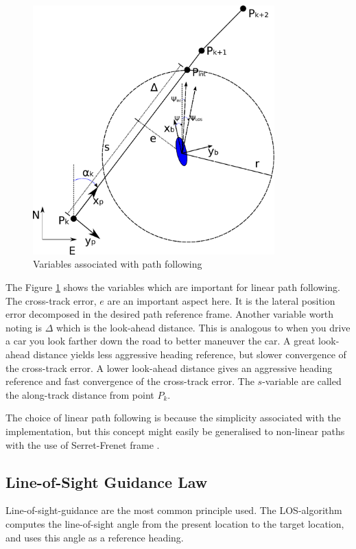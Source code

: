 	\begin{figure}[hbtp]
		\centering
		\includegraphics[width=0.83\textwidth]{pics/waypoint}
		\caption{Variables associated with path following}
		\label{fig:ch2-pathfollowing}
	\end{figure}
	The Figure \ref{fig:ch2-pathfollowing} shows the variables which are important for linear path following. The
	cross-track error, $e$ are an important aspect here. It is the lateral position error decomposed in
	the desired path reference frame. Another variable worth noting is $\Delta$ which is the look-ahead
	distance. This is analogous to when you drive a car you look farther down the road to better maneuver
	the car. A great look-ahead distance yields less aggressive heading reference, but slower convergence of the
	cross-track error. A lower look-ahead distance gives an aggressive heading reference and fast
	convergence of the cross-track error. The $s$-variable are called the along-track distance from point
	$P_k$. 

	The choice of linear path following is because the simplicity associated with the implementation, but
	this concept might easily be generalised to non-linear paths with the use of Serret-Frenet frame
	\cite{modsim}.
	
	
	\subsection{Line-of-Sight Guidance Law}
	        Line-of-sight-guidance are the most common principle used. The LOS-algorithm computes
		the line-of-sight angle from the present location to the target location, and uses this
		angle as a reference heading.

